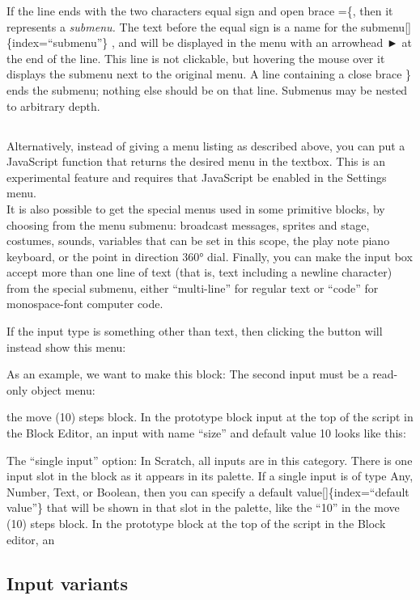 \documentclass[
  letterpaper,
]{book}
\begin{document}
If the line ends with the two characters equal sign and open brace =\{,
then it represents a \emph{submenu.} The text before the equal sign is a
name for the submenu{[}{]}\{index=``submenu''\} , and will be displayed
in the menu with an arrowhead ► at the end of the line. This line is not
clickable, but hovering the mouse over it displays the submenu next to
the original menu. A line containing a close brace \} ends the submenu;
nothing else should be on that line. Submenus may be nested to arbitrary
depth.

\subsection{}\label{section-2}

Alternatively, instead of giving a menu listing as described above, you
can put a JavaScript function that returns the desired menu in the
textbox. This is an experimental feature and requires that JavaScript be
enabled in the Settings menu.\\
It is also possible to get the special menus used in some primitive
blocks, by choosing from the menu submenu: broadcast messages, sprites
and stage, costumes, sounds, variables that can be set in this scope,
the play note piano keyboard, or the point in direction 360° dial.
Finally, you can make the input box accept more than one line of text
(that is, text including a newline character) from the special submenu,
either ``multi-line'' for regular text or ``code'' for monospace-font
computer code.

If the input type is something other than text, then clicking the button
will instead show this menu:

As an example, we want to make this block: The second input must be a
read-only object menu:

the move (10) steps block. In the prototype block input at the top of
the script in the Block Editor, an input with name ``size'' and default
value 10 looks like this:

The ``single input'' option: In Scratch, all inputs are in this
category. There is one input slot in the block as it appears in its
palette. If a single input is of type Any, Number, Text, or Boolean,
then you can specify a default value{[}{]}\{index=``default value''\}
that will be shown in that slot in the palette, like the ``10'' in the
move (10) steps block. In the prototype block at the top of the script
in the Block editor, an

\subsection{Input variants}\label{input-variants}
\end{document}
